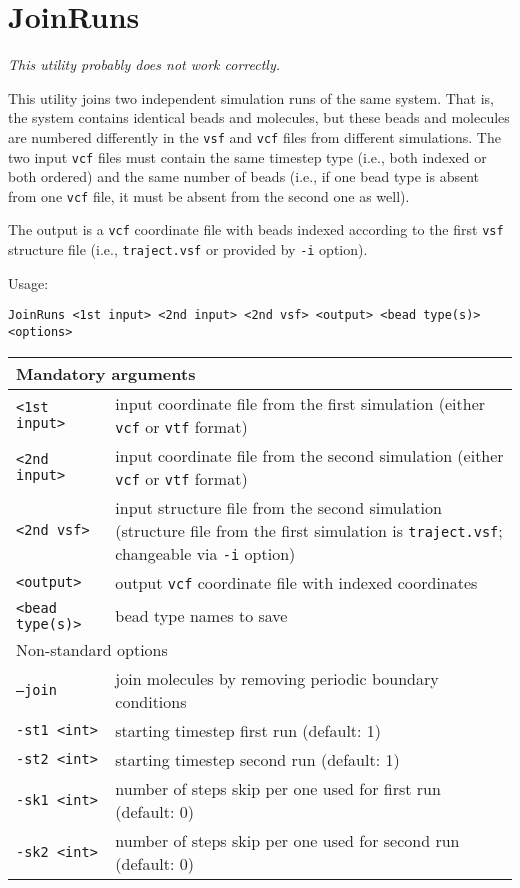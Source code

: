 \section{JoinRuns} \label{sec:JoinRuns}

{\it This utility probably does not work correctly.}

This utility joins two independent simulation runs of the same system.
That is, the system contains identical beads and molecules, but these beads
and molecules are numbered differently in the \texttt{vsf} and \texttt{vcf}
files from different simulations. The two input \texttt{vcf} files must
contain the same timestep type (i.e., both indexed or both ordered) and the
same number of beads (i.e., if one bead type is absent from one
\texttt{vcf} file, it must be absent from the second one as well).

The output is a \texttt{vcf} coordinate file with beads indexed according
to the first \texttt{vsf} structure file (i.e., \texttt{traject.vsf} or
provided by \texttt{-i} option).

Usage:

\vspace{1em}
\noindent
\texttt{JoinRuns <1st input> <2nd input> <2nd vsf> <output> <bead type(s)> \\ <options>}

\vspace{1em}
\noindent
\begin{longtable}{p{}p{}}
  \toprule
  \multicolumn{2}{l}{Mandatory arguments} \\
  \midrule
  \texttt{<1st input>} & input coordinate file from the first simulation (either \texttt{vcf} or
    \texttt{vtf} format) \\
  \texttt{<2nd input>} & input coordinate file from the second simulation (either \texttt{vcf} or
    \texttt{vtf} format) \\
  \texttt{<2nd vsf>} & input structure file from the second simulation
    (structure file from the first simulation is \texttt{traject.vsf};
    changeable via \texttt{-i} option) \\
  \texttt{<output>} & output \texttt{vcf} coordinate file with indexed
    coordinates \\
  \texttt{<bead type(s)>} & bead type names to save \\
  \toprule
  \multicolumn{2}{l}{Non-standard options} \\
  \midrule
  \texttt{--join} & join molecules by removing periodic boundary conditions \\
  \texttt{-st1 <int>} & starting timestep first run (default: 1) \\
  \texttt{-st2 <int>} & starting timestep second run (default: 1) \\
  \texttt{-sk1 <int>} & number of steps skip per one used for first run (default: 0) \\
  \texttt{-sk2 <int>} & number of steps skip per one used for second run (default: 0) \\
  \bottomrule
\end{longtable}
